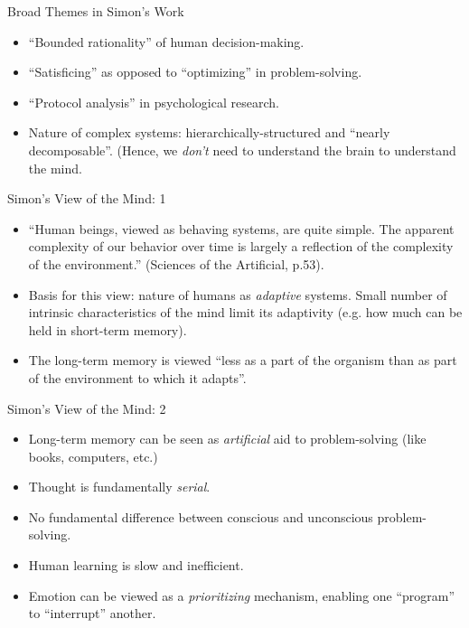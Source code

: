 \documentclass{article}
\begin{document}
\begin{slide}{}
{\Large Broad Themes in Simon's Work}
\begin{itemize}
\item ``Bounded rationality'' of human decision-making.
\item ``Satisficing'' as opposed to ``optimizing'' in problem-solving.
\item ``Protocol analysis'' in psychological research.
\item Nature of complex systems: hierarchically-structured and
``nearly decomposable''. (Hence, we {\em don't} need to understand the
brain to understand the mind.
\end{itemize}
\end{slide}

\begin{slide}{}
{\Large Simon's View of the Mind: 1}
\begin{itemize}
\item ``Human beings, viewed as behaving systems, are quite
simple. The apparent complexity of our behavior over time is largely a
reflection of the complexity of the environment.'' (Sciences of the
Artificial, p.53).
\item Basis for this view: nature of humans as {\em adaptive}
systems. Small number of intrinsic characteristics of the mind limit
its adaptivity (e.g. how much can be held in short-term memory).
\item The long-term memory is viewed ``less as a part of the organism
than as part of the environment to which it adapts''.
\end{itemize}
\end{slide}

\begin{slide}{}
{\Large Simon's View of the Mind: 2}
\begin{itemize}
\item Long-term memory can be seen as {\em artificial} aid to
problem-solving (like books, computers, etc.)
\item Thought is fundamentally {\em serial}.
\item No fundamental difference between conscious and unconscious
problem-solving.
\item Human learning is slow and inefficient.
\item Emotion can be viewed as a {\em prioritizing} mechanism,
enabling one ``program'' to ``interrupt'' another.
\end{itemize}
\end{slide}
\end{document}
